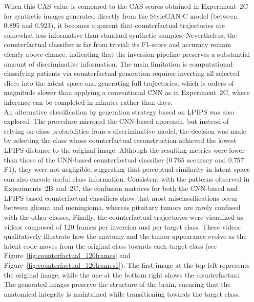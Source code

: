 When this CAS value is compared to the CAS scores obtained in Experiment~2C for synthetic images generated directly from the StyleGAN-C model (between $0.895$ and $0.923$), it becomes apparent that counterfactual trajectories are somewhat less informative than standard synthetic samples. Nevertheless, the counterfactual classifier is far from trivial: its F1-score and accuracy remain clearly above chance, indicating that the inversion pipeline preserves a substantial amount of discriminative information. The main limitation is computational: classifying patients via counterfactual generation requires inverting all selected slices into the latent space and generating full trajectories, which is orders of magnitude slower than applying a conventional CNN as in Experiment~2C, where inference can be completed in minutes rather than days.\\

An alternative classification by generation strategy based on LPIPS was also explored. The procedure mirrored the CNN-based approach, but instead of relying on class probabilities from a discriminative model, the decision was made by selecting the class whose counterfactual reconstruction achieved the lowest LPIPS distance to the original image. Although the resulting metrics were lower than those of the CNN-based counterfactual classifier ($0.765$ accuracy and $0.757$ F1), they were not negligible, suggesting that perceptual similarity in latent space can also encode useful class information. Consistent with the patterns observed in Experiments~2B and~2C, the confusion matrices for both the CNN-based and LPIPS-based counterfactual classifiers show that most misclassifications occur between glioma and meningioma, whereas pituitary tumors are rarely confused with the other classes. Finally, the counterfactual trajectories were visualized as videos composed of 120 frames per inversion and per target class. These videos qualitatively illustrate how the anatomy and the tumor appearance evolve as the latent code moves from the original class towards each target class (see Figure~\ref{fig:counterfactual_120frames} and Figure~\ref{fig:counterfactual_120frames1}). The first image at the top left represents the original image, while the one at the bottom right shows the counterfactual. The generated images preserve the structure of the brain, ensuring that the anatomical integrity is maintained while transitioning towards the target class.\\


